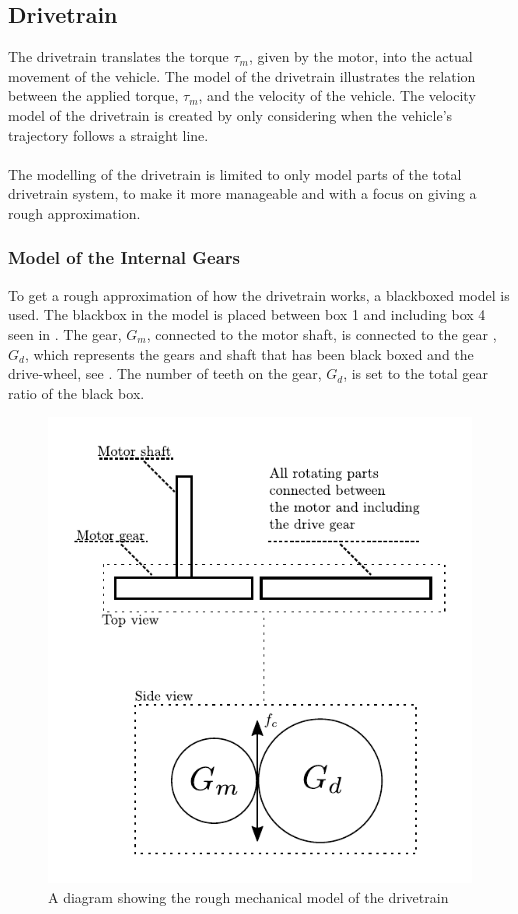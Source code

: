 \subsection{Drivetrain}\label{Drivetrain}

The drivetrain translates the torque $\tau_m$, given by the motor, into the actual movement of the vehicle. The model of the drivetrain illustrates the relation between the applied torque, $\tau_m$, and the velocity of the vehicle. The velocity model of the drivetrain is created by only considering when the vehicle's trajectory follows a straight line.\\\\
%
The modelling of the drivetrain is limited to only model parts of the total drivetrain system, to make it more manageable and with a focus on giving a rough approximation.
\subsubsection{Model of the Internal Gears}\label{BlackBoxModel}
To get a rough approximation of how the drivetrain works, a blackboxed model is used. The blackbox in the model is placed between box 1 and including box 4 seen in  . The gear, $G_m$, connected to the motor shaft, is connected to the gear ,$G_d$, which represents the gears and shaft that has been black boxed and the drive-wheel, see . The number of teeth on the gear, $G_d$, is set to the total gear ratio of the black box.

\begin{figure}[H]
	\centering
	\includegraphics[scale=0.8]{figures/mechanicalDrawingSystem.pdf}
	\caption{A diagram showing the rough mechanical model of the drivetrain}
	\label{fig:DrivetrainMechanicalModel}
\end{figure}

